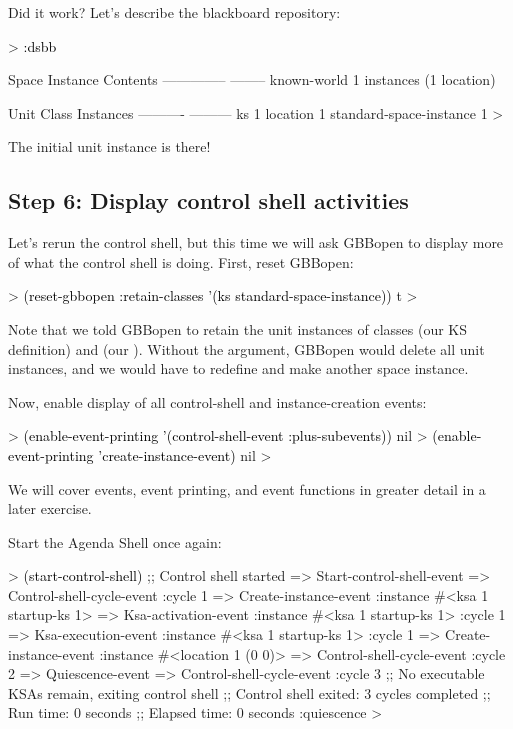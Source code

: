 \documentclass[10pt,twoside,english,pdftex]{article}
\begin{document}
Did it work?  Let's describe the blackboard repository:
%
\begin{example}\color{darkergray}%
  > \textcolor{black}{:dsbb}
  
  Space Instance                Contents
  --------------                --------
  known-world                   1 instances (1 location)

  Unit Class                    Instances
  ----------                    ---------
  ks                                    1
  location                              1
  standard-space-instance               1
  >
\end{example}

The initial  unit instance is there!

\subsection*{Step 6: Display control shell activities}

Let's rerun the control shell, but this time we will ask GBBopen to display
more of what the control shell is doing.  First, reset GBBopen:
%
\begin{example}\color{darkergray}%
  > \textcolor{black}{(reset-gbbopen :retain-classes '(ks standard-space-instance))}
  t
  >
\end{example}
%
Note that we told GBBopen to retain the unit instances of classes 
(our KS definition) and  (our
).  Without the  argument, GBBopen
would delete all unit instances, and we would have to redefine
 and make another  space instance.

Now, enable display of all control-shell and instance-creation events:
%
\begin{example}\color{darkergray}%
  > \textcolor{black}{(enable-event-printing '(control-shell-event :plus-subevents))}
  nil
  > \textcolor{black}{(enable-event-printing 'create-instance-event)}
  nil
  >
\end{example}
%
We will cover events, event printing, and event functions in greater
detail in a later exercise.

%
Start the Agenda Shell once again:
%
\begin{example}\color{darkergray}%
  > \textcolor{black}{(start-control-shell)}
  ;; Control shell started
  => Start-control-shell-event
  => Control-shell-cycle-event
       :cycle 1
  => Create-instance-event
       :instance #<ksa 1 startup-ks 1>
  => Ksa-activation-event
       :instance #<ksa 1 startup-ks 1>
       :cycle 1
  => Ksa-execution-event
       :instance #<ksa 1 startup-ks 1>
       :cycle 1
  => Create-instance-event
       :instance #<location 1 (0 0)>
  => Control-shell-cycle-event
       :cycle 2
  => Quiescence-event
  => Control-shell-cycle-event
       :cycle 3
  ;; No executable KSAs remain, exiting control shell
  ;; Control shell exited: 3 cycles completed
  ;; Run time: 0 seconds
  ;; Elapsed time: 0 seconds
  :quiescence
  >
\end{example}
\end{document}
